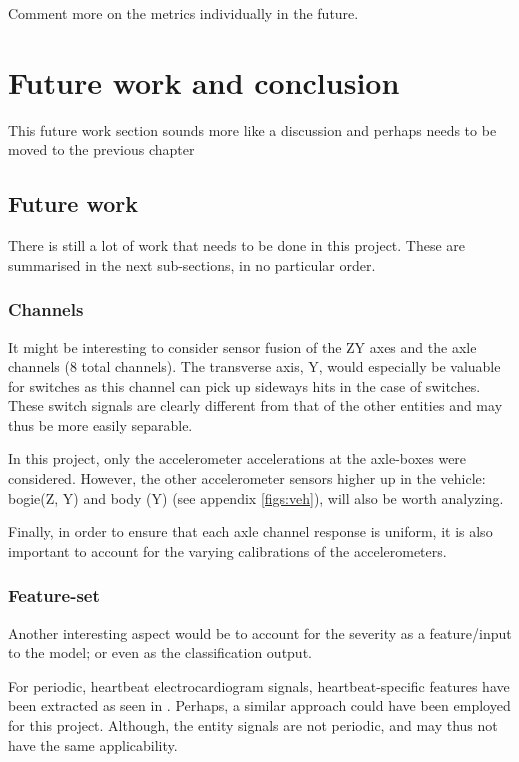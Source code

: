 Comment more on the metrics individually in the future.\todo{}
\chapter{Future work and conclusion}
This future work section sounds more like a discussion and perhaps needs to be moved to the previous chapter\todo{}
\section{Future work}
There is still a lot of work that needs to be done in this project. These are summarised in the next sub-sections, in no particular order. 

\subsection{Channels}
It might be interesting to consider sensor fusion of the ZY axes and the axle channels (8 total channels). The transverse axis, Y, would especially be valuable for switches as this channel can pick up sideways hits in the case of switches. These switch signals are clearly different from that of the other entities and may thus be more easily separable.
	
In this project, only the accelerometer accelerations at the axle-boxes were considered. However, the other accelerometer sensors higher up in the vehicle: bogie(Z, Y) and body (Y) (see appendix \ref{figs:veh}), will also be worth analyzing. 

Finally, in order to ensure that each axle channel response is uniform, it is also important to account for the varying calibrations of the accelerometers.

\subsection{Feature-set}
Another interesting aspect would be to account for the severity as a feature/input to the model; or even as the classification output.

For periodic, heartbeat electrocardiogram signals, heartbeat-specific features have been extracted as seen in \cite{10.3389/fphy.2019.00103}. Perhaps, a similar approach could have been employed for this project. Although, the entity signals are not periodic, and may thus not have the same applicability.

